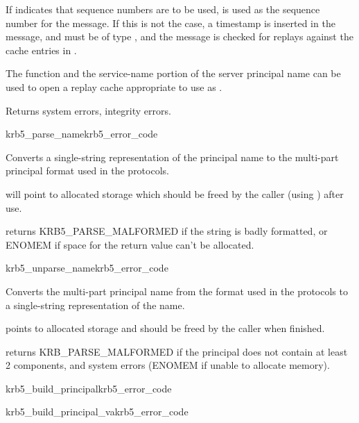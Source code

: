 If  indicates that sequence numbers are to be
used,  is used as the sequence number for the
message.  If this is not the case, a timestamp is inserted in the
message, and  must be of type
, and the message is checked for replays
against the cache entries in .

The function  and the service-name
portion of the server principal name can be used to open a
replay cache appropriate to use as .

Returns system errors, integrity errors.

\begin{funcdecl}{krb5_parse_name}{krb5_error_code}{\funcin}
\funcout
{}
\end{funcdecl}

Converts a single-string representation  of the
principal name to the multi-part principal format used in the protocols.

 will point to allocated storage which should be freed by
the caller (using ) after use.

 returns KRB5_PARSE_MALFORMED if the string is
 badly formatted, or ENOMEM if space for the return value can't be
allocated.

\begin{funcdecl}{krb5_unparse_name}{krb5_error_code}{\funcin}
\funcout
{}
\end{funcdecl}

Converts the multi-part principal name  from the
format used in the protocols to a single-string representation of the name.

 points to allocated storage and should be freed by the caller
when finished.

 returns KRB_PARSE_MALFORMED if the principal
does not contain at least 2 components, and system errors (ENOMEM if
unable to allocate memory).

\begin{funcdecl}{krb5_build_principal}{krb5_error_code}{\funcout}
\funcin
{}
\end{funcdecl}
\begin{funcdecl}{krb5_build_principal_va}{krb5_error_code}{\funcout}
\funcin
{}
\end{funcdecl}

